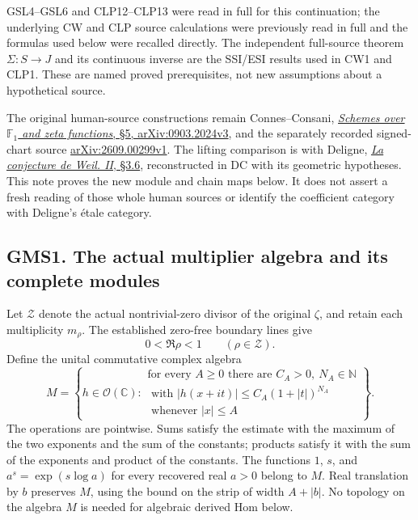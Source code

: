 GSL4--GSL6 and CLP12--CLP13 were read in full for this continuation; the
underlying CW and CLP source calculations were previously read in full
and the formulas used below were recalled directly. The independent
full-source theorem \(\Sigma:S\to J\) and its continuous inverse are the
SSI/ESI results used in CW1 and CLP1. These are named proved
prerequisites, not new assumptions about a hypothetical source.

The original human-source constructions remain Connes--Consani,
\href{https://arxiv.org/abs/0903.2024v3}{\emph{Schemes over
\(\mathbb F_1\) and zeta functions}, §5, arXiv:0903.2024v3}, and the
separately recorded signed-chart source
\href{https://arxiv.org/abs/2609.00299v1}{arXiv:2609.00299v1}. The
lifting comparison is with Deligne,
\href{https://www.numdam.org/item/PMIHES_1980__52__137_0/}{\emph{La
conjecture de Weil. II}, §3.6}, reconstructed in DC with its geometric
hypotheses. This note proves the new module and chain maps below. It
does not assert a fresh reading of those whole human sources or identify
the coefficient category with Deligne's étale category.

\subsection{GMS1. The actual multiplier algebra and its complete
modules}\label{gms1.-the-actual-multiplier-algebra-and-its-complete-modules}

Let \(\mathscr Z\) denote the actual nontrivial-zero divisor of the
original \(\zeta\), and retain each multiplicity \(m_\rho\). The
established zero-free boundary lines give \[
0<\Re\rho<1\qquad(\rho\in\mathscr Z).
\tag{GMS1.1}
\] Define the unital commutative complex algebra \[
M=\left\{h\in\mathcal O(\mathbb C):
\begin{gathered}
\text{for every }A\ge0\text{ there are }C_A>0,\ N_A\in\mathbb N\\
\text{ with }|h(x+it)|\le C_A(1+|t|)^{N_A}\\
\text{ whenever }|x|\le A
\end{gathered}\right\}.
\tag{GMS1.2}
\] The operations are pointwise. Sums satisfy the estimate with the
maximum of the two exponents and the sum of the constants; products
satisfy it with the sum of the exponents and product of the constants.
The functions \(1\), \(s\), and \(a^s=\exp(s\log a)\) for every
recovered real \(a>0\) belong to \(M\). Real translation by \(b\)
preserves \(M\), using the bound on the strip of width \(A+|b|\). No
topology on the algebra \(M\) is needed for algebraic derived Hom below.

